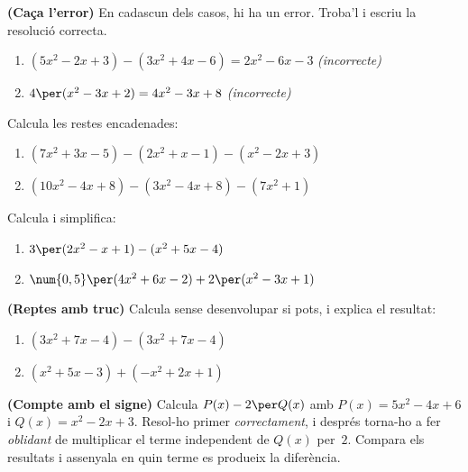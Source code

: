 \begin{exercicis}
\begin{exlist}
  \item \textbf{(Caça l'error)} En cadascun dels casos, hi ha un error.
        Troba'l i escriu la resolució correcta.
    \begin{enumerate}[label=\alph*), leftmargin=1.6em, topsep=2pt]
      \item $(5x^2-2x+3)-(3x^2+4x-6) = 2x^2-6x-3$ \quad \emph{(incorrecte)}
      \item $4\per(x^2-3x+2) = 4x^2-3x+8$ \quad \emph{(incorrecte)}
    \end{enumerate}

  \item Calcula les restes encadenades:
    \begin{enumerate}[label=\alph*), leftmargin=1.6em, topsep=2pt]
      \item $(7x^2+3x-5)-(2x^2+x-1)-(x^2-2x+3)$
      \item $(10x^2-4x+8)-(3x^2-4x+8)-(7x^2+1)$
    \end{enumerate}

  \item Calcula i simplifica:
    \begin{enumerate}[label=\alph*), leftmargin=1.6em, topsep=2pt]
      \item $3\per(2x^2-x+1)-(x^2+5x-4)$
      \item $\num{0,5}\per(4x^2+6x-2)+2\per(x^2-3x+1)$
    \end{enumerate}

  \item \textbf{(Reptes amb truc)} Calcula sense desenvolupar si pots,
        i explica el resultat:
    \begin{enumerate}[label=\alph*), leftmargin=1.6em, topsep=2pt]
      \item $(3x^2+7x-4)-(3x^2+7x-4)$
      \item $(x^2+5x-3)+(-x^2+2x+1)$
    \end{enumerate}

  \item \textbf{(Compte amb el signe)} Calcula $P(x)-2\per Q(x)$ amb
        $P(x)=5x^2-4x+6$ i $Q(x)=x^2-2x+3$.
        Resol-ho primer \emph{correctament}, i després torna-ho a fer
        \emph{oblidant} de multiplicar el terme independent de $Q(x)$
        per~$2$. Compara els resultats i assenyala en quin terme es
        produeix la diferència.


\end{exlist}
\end{exercicis}
